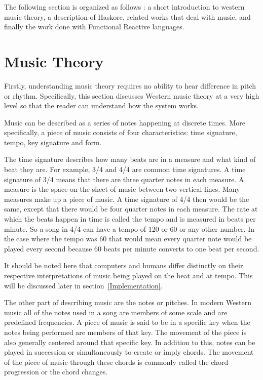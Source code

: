 \documentclass[12pt]{ucthesis}
\begin{document}
The following section is organized as follows : a short introduction to western music theory, a description of Haskore, related works that deal with music, and finally the work done with Functional Reactive languages.

\section{Music Theory}
\label{rw:music-theory}

Firstly, understanding music theory requires no ability to hear difference in pitch or rhythm. Specifically, this section discusses Western music theory at a very high level so that the reader can understand how the system works. 

Music can be described as a series of notes happening at discrete times. More specifically, a piece of music consists of four characteristics: time signature, tempo, key signature and form.

The time signature describes how many beats are in a measure and what kind of beat they are. For example, 3/4 and 4/4 are common time signatures. A time signature of 3/4 means that there are three quarter notes in each measure. A measure is the space on the sheet of music between two vertical lines. Many measures make up a piece of music. A time signature of 4/4 then would be the same, except that there would be four quarter notes in each measure. The rate at which the beats happen in time is called the tempo and is measured in beats per minute. So a song in 4/4 can have a tempo of 120 or 60 or any other number. In the case where the tempo was 60 that would mean every quarter note would be played every second because 60 beats per minute converts to one beat per second. 

It should be noted here that computers and humans differ distinctly on their respective interpretations of music being played on the beat and at tempo. This will be discussed later in section~\ref{Implementation}.

The other part of describing music are the notes or pitches. In modern Western music all of the notes used in a song are members of some scale and are predefined frequencies. A piece of music is said to be in a specific key when the notes being performed are members of that key. The movement of the piece is also generally centered around that specific key. In addition to this, notes can be played in succession or simultaneously to create or imply chords. The movement of the piece of music through these chords is commonly called the chord progression or the chord changes. 
\end{document}
